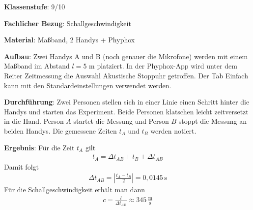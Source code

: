 \documentclass[../main.tex]{subfiles}
\begin{document}
\begin{tcolorbox}[
    width=\textwidth,
    height=\textheight,
    title=Phyphox: Schallgeschwindigkeit,
    fonttitle=\Large,
    before title=\vspace{0.2cm}, after title=\vspace{0.2cm},
    colback=white,
    title filled=true, 
    colbacktitle=myorange,
    colframe=black,
    coltitle=black,
    ]

    \vspace{0.2cm}

    \textbf{Klassenstufe}: 9/10

    \vspace{0.4cm}

    \textbf{Fachlicher Bezug}: Schallgeschwindigkeit

    \vspace{0.4cm}
    \textbf{Material}: Maßband, 2 Handys + Phyphox 

    \vspace{0.4cm}
    \begin{center}
        \def\svgwidth{400pt}
        
    \end{center}

    \vspace{0.5cm}
        \textbf{Aufbau}: Zwei Handys A und B (noch genauer die Mikrofone) werden mit einem Maßband im Abstand $l=5$ m platziert. In der Phyphox-App wird unter dem Reiter \glqq Zeitmessung\grqq{} die Auswahl \glqq Akustische Stoppuhr\grqq{} getroffen. Der Tab \glqq Einfach\grqq{} kann mit den Standardeinstellungen verwendet werden.

    \vspace{0.5cm}
    \textbf{Durchführung}: Zwei Personen stellen sich in einer Linie einen Schritt hinter die Handys und starten das Experiment. Beide Personen klatschen leicht zeitversetzt in die Hand. Person $A$ startet die Messung und Person $B$ stoppt die Messung an beiden Handys. Die gemessene Zeiten $t_A$ und $t_B$ werden notiert.

    \vspace{0.5cm}
    \begin{minipage}[c]{0.62\textwidth}
\textbf{Ergebnis}: Für die Zeit $t_A$ gilt
    \begin{align*}
        t_A = \Delta t_{AB} + t_B + \Delta t_{AB}
    \end{align*}
    Damit folgt
    \begin{align*}
        \Delta t_{AB} = \left | \frac{t_A-t_B}{2} \right | = 0,0145 \, \text{s} 
    \end{align*}
    Für die Schallgeschwindigkeit erhält man dann
    \begin{align*}
        c = \frac{l}{\Delta t_{AB}} \approx 345 \, \frac{\text{m}}{\text{s}}
    \end{align*}


\end{minipage}
\end{tcolorbox}
\end{document}
